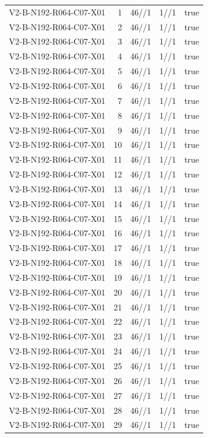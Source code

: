 {\begin{longtable}{lrrrr}
V2-B-N192-R064-C07-X01 & 1 & 46//1 & 1//1 & true \\
V2-B-N192-R064-C07-X01 & 2 & 46//1 & 1//1 & true \\
V2-B-N192-R064-C07-X01 & 3 & 46//1 & 1//1 & true \\
V2-B-N192-R064-C07-X01 & 4 & 46//1 & 1//1 & true \\
V2-B-N192-R064-C07-X01 & 5 & 46//1 & 1//1 & true \\
V2-B-N192-R064-C07-X01 & 6 & 46//1 & 1//1 & true \\
V2-B-N192-R064-C07-X01 & 7 & 46//1 & 1//1 & true \\
V2-B-N192-R064-C07-X01 & 8 & 46//1 & 1//1 & true \\
V2-B-N192-R064-C07-X01 & 9 & 46//1 & 1//1 & true \\
V2-B-N192-R064-C07-X01 & 10 & 46//1 & 1//1 & true \\
V2-B-N192-R064-C07-X01 & 11 & 46//1 & 1//1 & true \\
V2-B-N192-R064-C07-X01 & 12 & 46//1 & 1//1 & true \\
V2-B-N192-R064-C07-X01 & 13 & 46//1 & 1//1 & true \\
V2-B-N192-R064-C07-X01 & 14 & 46//1 & 1//1 & true \\
V2-B-N192-R064-C07-X01 & 15 & 46//1 & 1//1 & true \\
V2-B-N192-R064-C07-X01 & 16 & 46//1 & 1//1 & true \\
V2-B-N192-R064-C07-X01 & 17 & 46//1 & 1//1 & true \\
V2-B-N192-R064-C07-X01 & 18 & 46//1 & 1//1 & true \\
V2-B-N192-R064-C07-X01 & 19 & 46//1 & 1//1 & true \\
V2-B-N192-R064-C07-X01 & 20 & 46//1 & 1//1 & true \\
V2-B-N192-R064-C07-X01 & 21 & 46//1 & 1//1 & true \\
V2-B-N192-R064-C07-X01 & 22 & 46//1 & 1//1 & true \\
V2-B-N192-R064-C07-X01 & 23 & 46//1 & 1//1 & true \\
V2-B-N192-R064-C07-X01 & 24 & 46//1 & 1//1 & true \\
V2-B-N192-R064-C07-X01 & 25 & 46//1 & 1//1 & true \\
V2-B-N192-R064-C07-X01 & 26 & 46//1 & 1//1 & true \\
V2-B-N192-R064-C07-X01 & 27 & 46//1 & 1//1 & true \\
V2-B-N192-R064-C07-X01 & 28 & 46//1 & 1//1 & true \\
V2-B-N192-R064-C07-X01 & 29 & 46//1 & 1//1 & true \\

\end{longtable}}
